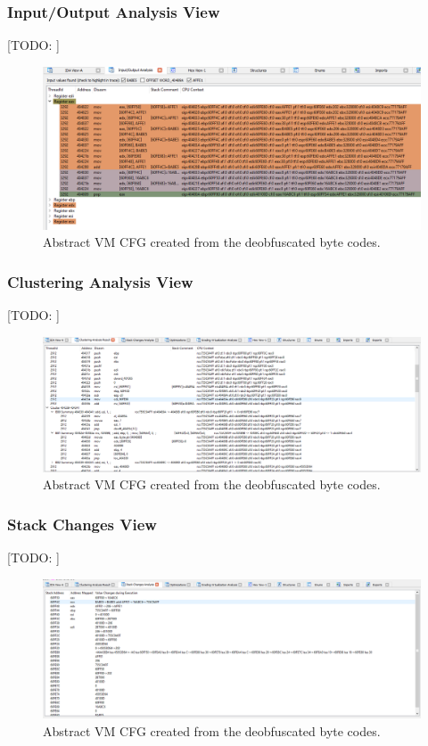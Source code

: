 \documentclass[10pt,twoside,a4paper,bibliography=totoc]{scrbook}
\newcommand{\todo}[1]{{\color{magenta} [TODO: #1]}}
\begin{document}
\subsubsection{Input/Output Analysis View}
\todo{}
\begin{figure}[H]
\centering
\includegraphics[scale=0.60]{images/ch3/InputOutput3.png}
\caption{Abstract VM CFG created from the deobfuscated byte codes.}
\label{}
\end{figure}

\subsubsection{Clustering Analysis View}
\todo{}
\begin{figure}[H]
\centering
\includegraphics[scale=0.50]{images/ch3/clustering1.png}
\caption{Abstract VM CFG created from the deobfuscated byte codes.}
\label{}
\end{figure}

\subsubsection{Stack Changes View}
\todo{}
\begin{figure}[H]
\centering
\includegraphics[scale=0.50]{images/ch3/StackChanges.png}
\caption{Abstract VM CFG created from the deobfuscated byte codes.}
\label{}
\end{figure}
\end{document}
